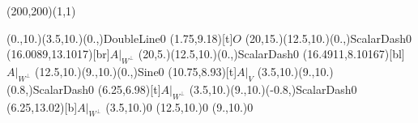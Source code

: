 \unitlength=1bp%

\begin{feynartspicture}(200,200)(1,1)

\FADiagram{}
\FAProp(0.,10.)(3.5,10.)(0.,){DoubleLine}{0}
\FALabel(1.75,9.18)[t]{$O$}
\FAProp(20,15.)(12.5,10.)(0.,){ScalarDash}{0}
\FALabel(16.0089,13.1017)[br]{$A|_{W^\perp}$}
\FAProp(20,5.)(12.5,10.)(0.,){ScalarDash}{0}
\FALabel(16.4911,8.10167)[bl]{$A|_{W^\perp}$}
\FAProp(12.5,10.)(9.,10.)(0.,){Sine}{0}
\FALabel(10.75,8.93)[t]{$A|_V$}
\FAProp(3.5,10.)(9.,10.)(0.8,){ScalarDash}{0}
\FALabel(6.25,6.98)[t]{$A|_{W^\perp}$}
\FAProp(3.5,10.)(9.,10.)(-0.8,){ScalarDash}{0}
\FALabel(6.25,13.02)[b]{$A|_{W^\perp}$}
\FAVert(3.5,10.){0}
\FAVert(12.5,10.){0}
\FAVert(9.,10.){0}
\end{feynartspicture}

